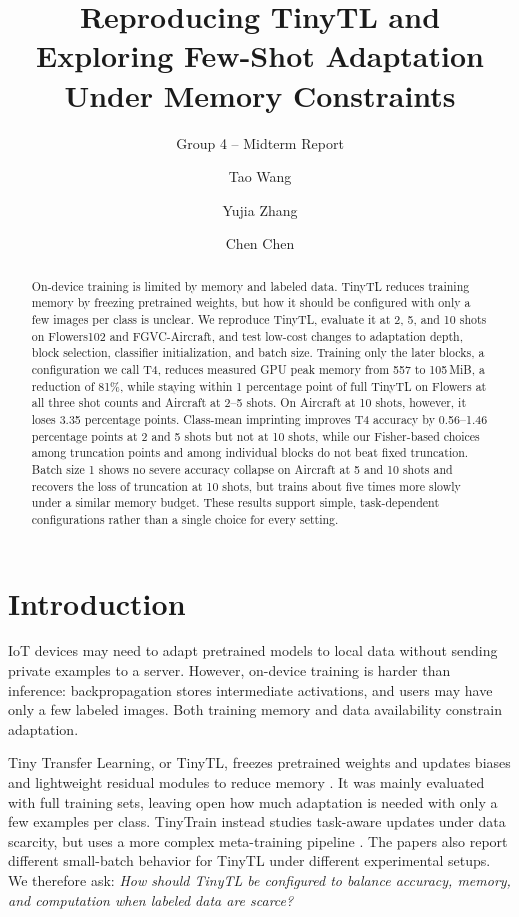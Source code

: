 \documentclass[sigconf,nonacm]{acmart}
\title[Reproducing TinyTL for Few-Shot Learning]{Reproducing TinyTL and Exploring Few-Shot Adaptation Under Memory Constraints}
\subtitle{Group 4 -- Midterm Report}
\author{Tao Wang}
\affiliation{\institution{Johns Hopkins University}\city{Baltimore}\state{Maryland}\country{USA}}
\author{Yujia Zhang}
\affiliation{\institution{Johns Hopkins University}\city{Baltimore}\state{Maryland}\country{USA}}
\author{Chen Chen}
\affiliation{\institution{Johns Hopkins University}\city{Baltimore}\state{Maryland}\country{USA}}
\begin{document}
\begin{abstract}
On-device training is limited by memory and labeled data. TinyTL reduces training memory by freezing pretrained weights, but how it should be configured with only a few images per class is unclear. We reproduce TinyTL, evaluate it at 2, 5, and 10 shots on Flowers102 and FGVC-Aircraft, and test low-cost changes to adaptation depth, block selection, classifier initialization, and batch size. Training only the later blocks, a configuration we call T4, reduces measured GPU peak memory from 557 to 105\,MiB, a reduction of 81\%, while staying within 1 percentage point of full TinyTL on Flowers at all three shot counts and Aircraft at 2--5 shots. On Aircraft at 10 shots, however, it loses 3.35 percentage points. Class-mean imprinting improves T4 accuracy by 0.56--1.46 percentage points at 2 and 5 shots but not at 10 shots, while our Fisher-based choices among truncation points and among individual blocks do not beat fixed truncation. Batch size 1 shows no severe accuracy collapse on Aircraft at 5 and 10 shots and recovers the loss of truncation at 10 shots, but trains about five times more slowly under a similar memory budget. These results support simple, task-dependent configurations rather than a single choice for every setting.
\end{abstract}

\maketitle

\section{Introduction}
IoT devices may need to adapt pretrained models to local data without sending private examples to a server. However, on-device training is harder than inference: backpropagation stores intermediate activations, and users may have only a few labeled images. Both training memory and data availability constrain adaptation.

Tiny Transfer Learning, or TinyTL, freezes pretrained weights and updates biases and lightweight residual modules to reduce memory \cite{cai2020tinytl}. It was mainly evaluated with full training sets, leaving open how much adaptation is needed with only a few examples per class. TinyTrain instead studies task-aware updates under data scarcity, but uses a more complex meta-training pipeline \cite{kwon2024tinytrain}. The papers also report different small-batch behavior for TinyTL under different experimental setups. We therefore ask: \emph{How should TinyTL be configured to balance accuracy, memory, and computation when labeled data are scarce?}
\end{document}
